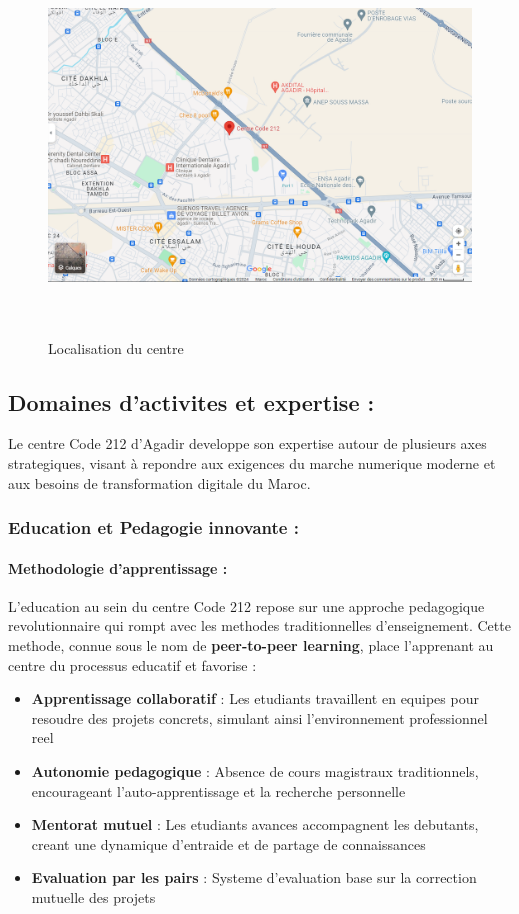\begin{figure}[H]
\centering
\includegraphics[height=10cm , width=\textwidth]{assets/images/maps.png}
\caption{Localisation du centre}
\label{fig:localisationcentre}
\end{figure}

\subsection{Domaines d'activites et expertise :}

Le centre Code 212 d'Agadir developpe son expertise autour de plusieurs axes strategiques, visant à repondre aux exigences du marche numerique moderne et aux besoins de transformation digitale du Maroc.

\subsubsection{Education et Pedagogie innovante :}

\paragraph{Methodologie d'apprentissage :}
L'education au sein du centre Code 212 repose sur une approche pedagogique revolutionnaire qui rompt avec les methodes traditionnelles d'enseignement. Cette methode, connue sous le nom de \textbf{peer-to-peer learning}, place l'apprenant au centre du processus educatif et favorise :

\begin{itemize}
    \item \textbf{Apprentissage collaboratif} : Les etudiants travaillent en equipes pour resoudre des projets concrets, simulant ainsi l'environnement professionnel reel
    \item \textbf{Autonomie pedagogique} : Absence de cours magistraux traditionnels, encourageant l'auto-apprentissage et la recherche personnelle
    \item \textbf{Mentorat mutuel} : Les etudiants avances accompagnent les debutants, creant une dynamique d'entraide et de partage de connaissances
    \item \textbf{Evaluation par les pairs} : Systeme d'evaluation base sur la correction mutuelle des projets
\end{itemize}


